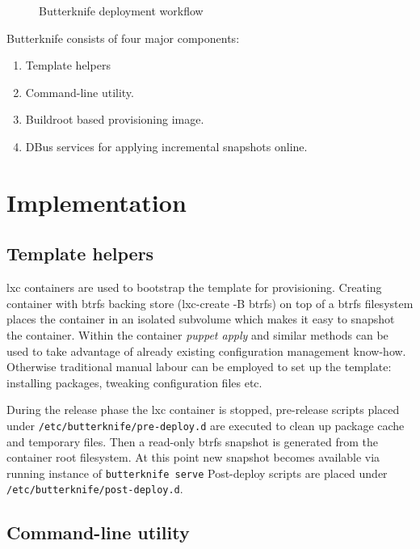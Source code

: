 \documentclass[a4paper,11pt]{kth-mag}
\begin{document}
\begin{figure}[!htb]
\centering
\scalebox{0.6}{}
\caption{Butterknife deployment workflow}
\label{fig:butterknife-workflow}
\end{figure}



\noindent Butterknife consists of four major components:

\begin{enumerate}
\item Template helpers
\item Command-line utility.
\item Buildroot based provisioning image.
\item DBus services for applying incremental snapshots online.
\end{enumerate}


%
%
%
%
\chapter{Implementation}
\label{chap:impl}



\section{Template helpers}

\acrshort{lxc} containers are used to bootstrap the template for provisioning.
Creating container with \acrshort{btrfs} backing store (lxc-create -B btrfs)
on top of a \acrshort{btrfs} filesystem places the container in an
isolated subvolume which makes it easy to snapshot the container.
Within the container \emph{puppet apply} and similar methods can be used
to take advantage of already existing configuration management know-how.
Otherwise traditional manual labour can be employed
to set up the template: installing packages, tweaking configuration files etc.

During the release phase the \acrshort{lxc} container is stopped,
pre-release scripts placed under \lstinline!/etc/butterknife/pre-deploy.d!
are executed to clean up package cache and temporary files.
Then a read-only \acrshort{btrfs} snapshot is generated from the container root filesystem.
At this point new snapshot becomes available via running instance of
\lstinline!butterknife serve!
Post-deploy scripts are placed under \lstinline!/etc/butterknife/post-deploy.d!.


\section{Command-line utility}
\end{document}
